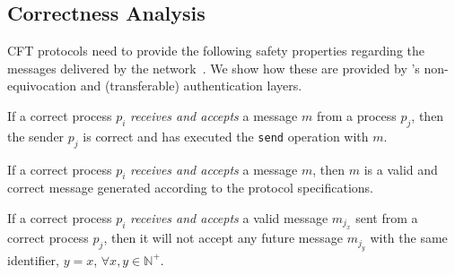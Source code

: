 \subsection{Correctness Analysis}
CFT protocols need to provide the following safety properties regarding the messages delivered by the network~\cite{making_distributed_app_rob, 268272}. We show how these are provided by \projecttitle{}'s non-equivocation and (transferable) authentication layers.




 If a correct process $p_i$ \emph{receives and accepts} a message $m$ from a process $p_j$, then the sender $p_j$ is correct and has executed the \texttt{send} operation with $m$.

 If a correct process $p_i$ \emph{receives and accepts} a message $m$, then $m$ is a valid and correct message generated according to the protocol specifications.

 If a correct process $p_i$ \emph{receives and accepts} a valid message $m_{j_x}$ sent from a correct process $p_j$, then it will not accept any future message $m_{j_y}$ with the same identifier, $y = x$, $\forall$$x,y \in \mathbb{N^+}$.

